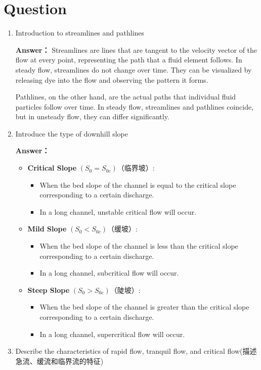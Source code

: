 \documentclass[12pt,a4paper]{article}
\newcounter{question}
\newenvironment{questions}{
    \setcounter{question}{0}
    \section*{Question}
    \begin{enumerate}[leftmargin=1.5em,label={\arabic*．}]
}{
    \end{enumerate}
}
\newcommand{\answer}[1]{\par\noindent\textbf{Answer：} #1\par\vspace{1em}}
\begin{document}
\begin{questions}
    \item Introduction to streamlines and pathlines
    
    \answer{
      Streamlines are lines that are tangent to the velocity vector of the flow at every point, representing the path that a fluid element follows. In steady flow, streamlines do not change over time. They can be visualized by releasing dye into the flow and observing the pattern it forms.

      Pathlines, on the other hand, are the actual paths that individual fluid particles follow over time. In steady flow, streamlines and pathlines coincide, but in unsteady flow, they can differ significantly.
    }

    \item Introduce the type of downhill slope
    
    \answer{
\begin{itemize}
  \item \textbf{Critical Slope} \((S_0 = S_{0c})\)（临界坡）:
    \begin{itemize}
      \item When the bed slope of the channel is equal to the critical slope corresponding to a certain discharge.
      \item In a long channel, unstable critical flow will occur.
    \end{itemize}
  \item \textbf{Mild Slope} \((S_0 < S_{0c})\)（缓坡）:
    \begin{itemize}
      \item When the bed slope of the channel is less than the critical slope corresponding to a certain discharge.
      \item In a long channel, subcritical flow will occur.
    \end{itemize}
  \item \textbf{Steep Slope} \((S_0 > S_{0c})\)（陡坡）:
    \begin{itemize}
      \item When the bed slope of the channel is greater than the critical slope corresponding to a certain discharge.
      \item In a long channel, supercritical flow will occur.
    \end{itemize}
\end{itemize}

    }

    \item Describe the characteristics of rapid flow, tranquil flow, and critical flow(描述急流、缓流和临界流的特征)



\end{questions}
\end{document}
